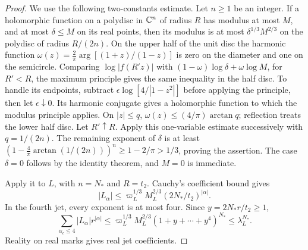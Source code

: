 \begin{proof}
We use the following two-constants estimate.
Let $n\ge1$ be an integer. If a holomorphic function
on a polydisc in $\mathbb C^n$ of radius $R$ has modulus at most $M$, and
at most $\delta\le M$ on its real points,
then its modulus is at most $\delta^{1/3}M^{2/3}$
on the polydisc of radius $R/(2n)$.
On the upper
half of the unit disc the harmonic function
$\omega(z)=\frac2\pi\arg[(1+z)/(1-z)]$
is zero on the diameter and one on the
semicircle. Comparing $\log|f(R'z)|$
with $(1-\omega)\log\delta+\omega\log M$,
for $R'<R$, the maximum principle gives
the same inequality in the half disc.
To handle its endpoints, subtract
$\epsilon\log[4/|1-z^2|]$ before applying
the principle, then let $\epsilon\downarrow0$.
Its harmonic conjugate gives a holomorphic
function to which the modulus principle
applies. On $|z|\le q$, $\omega(z)\le
(4/\pi)\arctan q$; reflection treats the
lower half disc. Let $R'\uparrow R$.
Apply this one-variable estimate successively
with $q=1/(2n)$. The remaining exponent of
$\delta$ is at least
$(1-\frac4\pi\arctan(1/(2n)))^n
\ge1-2/\pi>1/3$, proving the assertion.
The case $\delta=0$ follows by the identity
theorem, and $M=0$ is immediate.

Apply it to $L$, with $n=N_*$ and $R=t_2$.
Cauchy's coefficient bound gives
\[
 |L_\alpha|\le\varpi_L^{1/3}M_L^{2/3}(2N_*/t_2)^{|\alpha|}.
\]
In the fourth jet, every exponent is at most
four. Since $y=2N_*r/t_2\ge1$,
\[
 \sum_{\alpha_c\le4}|L_\alpha|r^{|\alpha|}
   \le\varpi_L^{1/3}M_L^{2/3}
                 (1+y+\cdots+y^4)^{N_*}
   \le\lambda_L^{N_*}.
\]
Reality on real marks gives real jet coefficients.
\end{proof}

